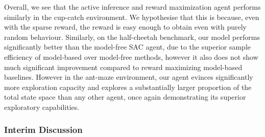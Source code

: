 Overall, we see that the active inference and reward maximization agent performs similarly in the cup-catch environment. We hypothesise that this is because, even with the sparse reward, the reward is easy enough to obtain even with purely random behaviour. Similarly, on the half-cheetah benchmark, our model performs significantly better than the model-free SAC agent, due to the superior sample efficiency of model-based over model-free methods, however it also does not show much significant improvement compared to reward maximizing model-based baselines. However in the ant-maze environment, our agent evinces significantly more exploration capacity and explores a substantially larger proportion of the total state space than any other agent, once again demonstrating its superior exploratory capabilities.

\subsubsection{Interim Discussion}



